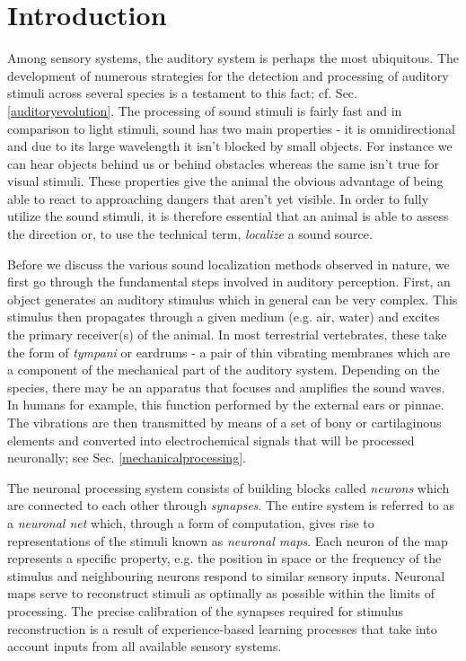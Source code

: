 \chapter{Introduction}\label{introchapter}
Among sensory systems, the auditory system is perhaps the most ubiquitous. The 
development of numerous strategies for the detection and processing of auditory stimuli
across several species is a testament to this fact; cf. Sec. \ref{auditoryevolution}. The processing of sound stimuli is fairly fast and in comparison
to light stimuli, sound has two main properties - it is omnidirectional and due to
its large wavelength it isn't blocked by small objects. For instance we can hear objects
behind us or behind obstacles whereas the same isn't true for visual stimuli. These properties 
give the animal the obvious advantage of being able to react to approaching dangers that
aren't yet visible. In order to fully utilize the sound stimuli, it is therefore essential
that an animal is able to assess the direction or, to use the technical term, \emph{localize} a sound source.

Before we discuss the various sound localization methods observed in nature, we first
go through the fundamental steps involved in auditory perception. First, an object generates
an auditory stimulus which in general can be very complex. This stimulus then propagates
through a given medium (e.g. air, water) and excites the primary receiver(s) of the animal. In most
terrestrial vertebrates, these take the form of \emph{tympani} or eardrums - a pair of thin vibrating
membranes which are a component of the mechanical part of the auditory system.
Depending on the species, there may be an apparatus that focuses and amplifies the sound waves. In
humans for example, this function performed by the external ears or pinnae. 
The vibrations are then transmitted by means of a set of bony or cartilaginous elements and
converted into electrochemical signals that will be processed neuronally; see Sec. \ref{mechanicalprocessing}.

The neuronal processing system consists of building blocks called \emph{neurons} which are
connected to each other through \emph{synapses}. The entire system is referred to as a 
\emph{neuronal net} which, through a form of computation, gives rise to representations of the stimuli
known as \emph{neuronal maps}. Each neuron of the map represents a specific property, e.g.
the position in space or the frequency of the stimulus and neighbouring neurons respond to
similar sensory inputs. Neuronal maps serve to reconstruct stimuli as optimally as possible
within the limits of processing. The precise calibration of the
synapses required for stimulus reconstruction is a result of experience-based learning
processes that take into account inputs from all available sensory systems.

